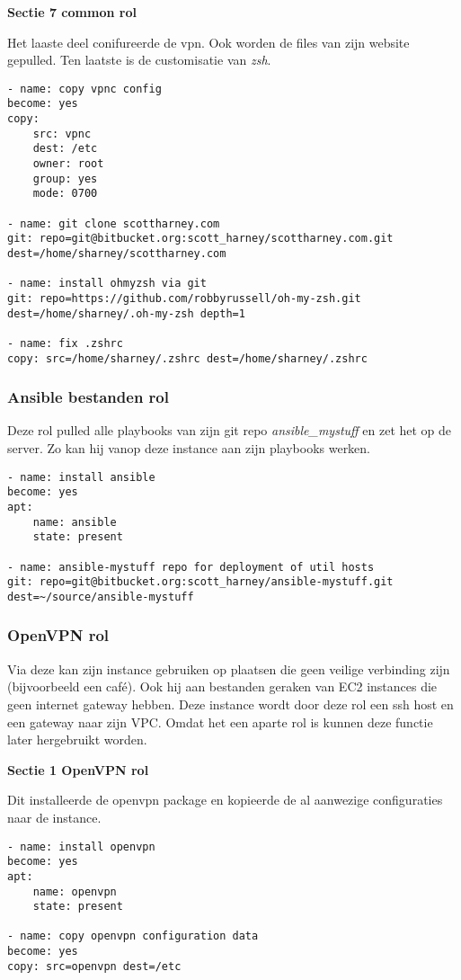 \textbf{Sectie 7 common rol}

Het laaste deel conifureerde de vpn. Ook worden de files van zijn website gepulled. Ten laatste is de customisatie van \textit{zsh}.
\begin{lstlisting}
- name: copy vpnc config
become: yes
copy:
    src: vpnc
    dest: /etc
    owner: root
    group: yes
    mode: 0700 

- name: git clone scottharney.com
git: repo=git@bitbucket.org:scott_harney/scottharney.com.git dest=/home/sharney/scottharney.com

- name: install ohmyzsh via git
git: repo=https://github.com/robbyrussell/oh-my-zsh.git  dest=/home/sharney/.oh-my-zsh depth=1 

- name: fix .zshrc
copy: src=/home/sharney/.zshrc dest=/home/sharney/.zshrc
\end{lstlisting}

\subsubsection{Ansible bestanden rol}
Deze rol pulled alle playbooks van \autocite{scottharney} zijn git repo \textit{ansible\_mystuff} en zet het op de server. Zo kan hij vanop deze instance aan zijn playbooks werken.
\begin{lstlisting}
- name: install ansible 
become: yes
apt:
    name: ansible
    state: present

- name: ansible-mystuff repo for deployment of util hosts
git: repo=git@bitbucket.org:scott_harney/ansible-mystuff.git  dest=~/source/ansible-mystuff    
\end{lstlisting}

\subsubsection{OpenVPN rol}

Via deze kan \autocite{scottharney} zijn instance gebruiken op plaatsen die geen veilige verbinding zijn (bijvoorbeeld een café). Ook hij aan bestanden geraken van EC2 instances die geen internet gateway hebben. Deze instance wordt door deze rol een ssh host en een gateway naar \autocite{scottharney} zijn VPC. Omdat het een aparte rol is kunnen deze functie later hergebruikt worden.

\textbf{Sectie 1 OpenVPN rol}

Dit installeerde de openvpn package en kopieerde de al aanwezige configuraties naar de instance.
\begin{lstlisting}
- name: install openvpn
become: yes
apt:
    name: openvpn
    state: present

- name: copy openvpn configuration data
become: yes
copy: src=openvpn dest=/etc
\end{lstlisting}

